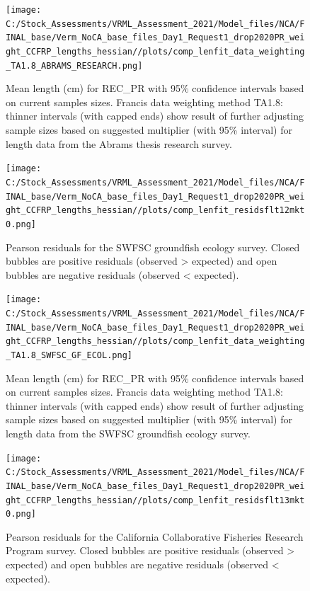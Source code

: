 \documentclass[11pt,
  english,
]{article}
\begin{document}
\begin{figure}
\centering
\texttt{[image: C:/Stock\_Assessments/VRML\_Assessment\_2021/Model\_files/NCA/FINAL\_base/Verm\_NoCA\_base\_files\_Day1\_Request1\_drop2020PR\_weight\_CCFRP\_lengths\_hessian//plots/comp\_lenfit\_data\_weighting\_TA1.8\_ABRAMS\_RESEARCH.png]}
\caption{Mean length (cm) for REC\_PR with 95\% confidence intervals based on current samples sizes. Francis data weighting method TA1.8: thinner intervals (with capped ends) show result of further adjusting sample sizes based on suggested multiplier (with 95\% interval) for length data from the Abrams thesis research survey.\label{fig:mean-len-fit-ABRAMS-RESEARCH}}
\end{figure}

\begin{figure}
\centering
\texttt{[image: C:/Stock\_Assessments/VRML\_Assessment\_2021/Model\_files/NCA/FINAL\_base/Verm\_NoCA\_base\_files\_Day1\_Request1\_drop2020PR\_weight\_CCFRP\_lengths\_hessian//plots/comp\_lenfit\_residsflt12mkt0.png]}
\caption{Pearson residuals for the SWFSC groundfish ecology survey. Closed bubbles are positive residuals (observed \textgreater{} expected) and open bubbles are negative residuals (observed \textless{} expected).\label{fig:len-pearson-SWFSC-GF-ECOL}}
\end{figure}

\begin{figure}
\centering
\texttt{[image: C:/Stock\_Assessments/VRML\_Assessment\_2021/Model\_files/NCA/FINAL\_base/Verm\_NoCA\_base\_files\_Day1\_Request1\_drop2020PR\_weight\_CCFRP\_lengths\_hessian//plots/comp\_lenfit\_data\_weighting\_TA1.8\_SWFSC\_GF\_ECOL.png]}
\caption{Mean length (cm) for REC\_PR with 95\% confidence intervals based on current samples sizes. Francis data weighting method TA1.8: thinner intervals (with capped ends) show result of further adjusting sample sizes based on suggested multiplier (with 95\% interval) for length data from the SWFSC groundfish ecology survey.\label{fig:mean-len-fit-SWFSC-GF-ECOL}}
\end{figure}

\begin{figure}
\centering
\texttt{[image: C:/Stock\_Assessments/VRML\_Assessment\_2021/Model\_files/NCA/FINAL\_base/Verm\_NoCA\_base\_files\_Day1\_Request1\_drop2020PR\_weight\_CCFRP\_lengths\_hessian//plots/comp\_lenfit\_residsflt13mkt0.png]}
\caption{Pearson residuals for the California Collaborative Fisheries Research Program survey. Closed bubbles are positive residuals (observed \textgreater{} expected) and open bubbles are negative residuals (observed \textless{} expected).\label{fig:len-pearson-CCFRP}}
\end{figure}
\end{document}
